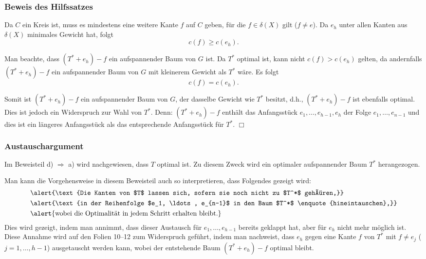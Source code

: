 \documentclass[smaller]{beamer}
\begin{document}
\begin{frame}
 \frametitle{Beweis des Hilfssatzes}
 Da $C$ ein Kreis ist, muss es mindestens eine weitere Kante $f$ auf $C$ geben, für die $f \in \delta(X)$ gilt ($f \neq e$). Da $e_h$ unter allen Kanten aus $\delta(X)$ minimales Gewicht hat, folgt
\[
c(f) \geq c(e_h).
\]

\medskip
Man beachte, dass $(T^*+e_h)-f$ ein aufspannender Baum von $G$ ist. Da $T^*$ optimal ist, kann nicht $c(f) > c(e_h)$ gelten, da andernfalls $(T^*+e_h)-f$ ein aufspannender Baum von $G$ mit kleinerem Gewicht als $T^*$ wäre. Es folgt 
\[
c(f) = c(e_h).
\]

\medskip
Somit ist $(T^*+e_h)-f$ ein aufspannender Baum von $G$, der dasselbe Gewicht wie $T^*$ besitzt, d.h., \alert{$(T^*+e_h)-f$ ist ebenfalls optimal.}\\ 
\medskip
Dies ist jedoch ein Widerspruch zur Wahl von $T^*$. Denn: $(T^*+e_h)-f$ enthält das Anfangsstück $e_1,\ldots,e_{h-1},e_h$ der Folge $e_1,\ldots,e_{n-1}$ und dies ist \alert{ein längeres Anfangsstück als das entsprechende Anfangsstück für $T^*$.} \qquad $\Box$ 
\end{frame}

\begin{frame}
 \frametitle{Austauschargument}
 \alert{Im Beweisteil d) $\Rightarrow$ a) wird nachgewiesen, dass $T$ optimal ist.} Zu diesem Zweck wird ein optimaler aufspannender Baum $T^*$ herangezogen. \\ \medskip

Man kann die Vorgehensweise in diesem Beweisteil auch so interpretieren, dass Folgendes gezeigt wird: 
\begin{align*}
&\alert{\text{Die Kanten von $T$ lassen sich, sofern sie noch nicht zu $T^*$ gehören,}}\\
&\alert{\text{in der Reihenfolge $e_1, \ldots, e_{n-1}$ in den Baum $T^*$ \enquote{hineintauschen},}}\\
&\alert{\text{wobei die Optimalität in jedem Schritt erhalten bleibt.}}
\end{align*}
Dies wird gezeigt, indem man annimmt, dass dieser Austausch für 
$e_1, \ldots , e_{h-1}$ bereits geklappt hat, aber für $e_h$ nicht mehr möglich ist. Diese Annahme wird auf den Folien 10--12 zum Widerspruch geführt, indem man nachweist, dass $e_h$ gegen eine Kante $f$ von $T^*$ mit $f \neq e_j$ ($j = 1, \ldots, h-1$) ausgetauscht werden kann, wobei der entstehende Baum $(T^* + e_h) - f$ optimal bleibt.
\end{frame}
\end{document}
